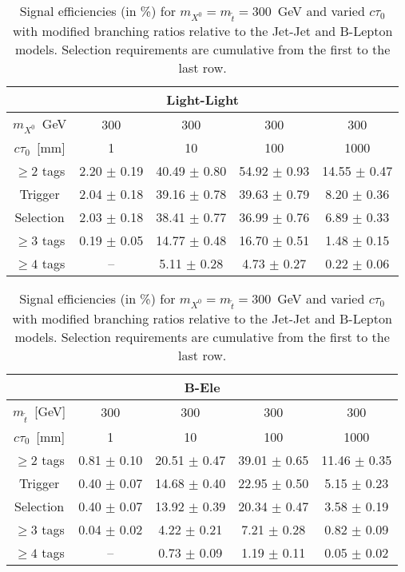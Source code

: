 \begin{table}[tb]
  \caption{ Signal efficiencies (in \%) for $m_{X^0}=m_{\tilde{t}}=300$~GeV
    and varied $c\tau_0$ with modified branching ratios relative to 
    the Jet-Jet and B-Lepton models. Selection requirements are cumulative from
    the first to the last row.  
    \label{tab:cutflow_BR_lifetime}}
\begin{center}
\begin{tabular}{ccccc} 
\multicolumn{5}{c}{\textbf{Light-Light}} \\
 \hline 
 $m_{X^0}$~GeV & 300 & 300 & 300 & 300 \\ 
 $c\tau_0$~[mm] & 1 & 10 & 100 & 1000 \\ 
 \hline 
 $\geq 2$ tags & 2.20 $\pm$ 0.19   & 40.49 $\pm$ 0.80 & 54.92 $\pm$ 0.93 & 14.55 $\pm$ 0.47  \\ 
 Trigger       & 2.04 $\pm$ 0.18   & 39.16 $\pm$ 0.78 & 39.63 $\pm$ 0.79 & 8.20 $\pm$ 0.36   \\ 
 Selection     & 2.03 $\pm$ 0.18   & 38.41 $\pm$ 0.77 & 36.99 $\pm$ 0.76 & 6.89 $\pm$ 0.33   \\ 
 $\geq 3$ tags & 0.19 $\pm$ 0.05 & 14.77 $\pm$ 0.48 & 16.70 $\pm$ 0.51 & 1.48 $\pm$ 0.15   \\ 
 $\geq 4$ tags & --                & 5.11 $\pm$ 0.28  & 4.73 $\pm$ 0.27  & 0.22 $\pm$ 0.06 \\ 
\end{tabular}

\begin{tabular}{ccccc} 
\multicolumn{5}{c}{\textbf{B-Ele}} \\
 \hline 
 $m_{\tilde{t}}$~[GeV] & 300 & 300 & 300 & 300 \\ 
 $c\tau_0$~[mm] & 1 & 10 & 100 & 1000 \\ 
 \hline 
  $\geq 2$ tags     & 0.81 $\pm$ 0.10 & 20.51 $\pm$ 0.47  & 39.01 $\pm$ 0.65 & 11.46 $\pm$ 0.35  \\ 
   Trigger          & 0.40 $\pm$ 0.07 & 14.68 $\pm$ 0.40  & 22.95 $\pm$ 0.50 & 5.15 $\pm$ 0.23   \\ 
    Selection       & 0.40 $\pm$ 0.07 & 13.92 $\pm$ 0.39  & 20.34 $\pm$ 0.47 & 3.58 $\pm$ 0.19   \\ 
     $\geq 3$ tags  & 0.04 $\pm$ 0.02 & 4.22 $\pm$ 0.21   & 7.21 $\pm$ 0.28  & 0.82 $\pm$ 0.09 \\ 
      $\geq 4$ tags & --                & 0.73 $\pm$ 0.09 & 1.19 $\pm$ 0.11  & 0.05 $\pm$ 0.02 \\ 
\end{tabular}


\end{center}
\end{table}
